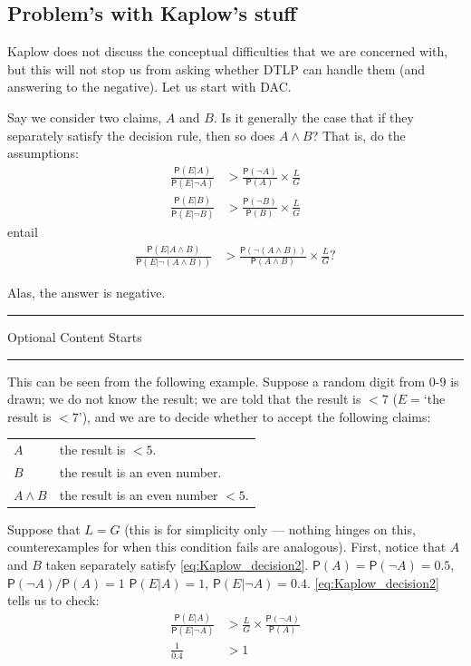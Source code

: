 \documentclass[10pt,dvipsnames,enabledeprecatedfontcommands]{scrartcl}
\newcommand{\n}{\neg}
\newcommand{\et}{\wedge}
\newcommand{\pr}[1]{\mathsf{P}(#1)}
\newcommand{\intermezzoa}{
	\begin{minipage}[c]{13cm}
	\begin{center}\rule{10cm}{0.4pt}



	\tiny{\sc Optional Content Starts}
	
	\vspace{-1mm}
	
	\rule{10cm}{0.4pt}\end{center}
	\end{minipage}\nopagebreak 
	}
\begin{document}
\hypertarget{problems-with-kaplows-stuff}{%
\subsection{Problem's with Kaplow's
stuff}\label{problems-with-kaplows-stuff}}

Kaplow does not discuss the conceptual difficulties that we are
concerned with, but this will not stop us from asking whether DTLP can
handle them (and answering to the negative). Let us start with DAC.

Say we consider two claims, \(A\) and \(B\). Is it generally the case
that if they separately satisfy the decision rule, then so does
\(A\et B\)? That is, do the assumptions: \begin{align*}
 \frac{\pr{E\vert A}}{\pr{E\vert \n A}}  & > \frac{\pr{\n A}}{\pr{A}} \times \frac{L}{G}\\
 \frac{\pr{E\vert B}}{\pr{E\vert \n B}}  & > \frac{\pr{\n B}}{\pr{B}} \times \frac{L}{G}
 \end{align*} \noindent entail \begin{align*}
 \frac{\pr{E\vert A\et B}}{\pr{E\vert \n (A\et B)}}  & > \frac{\pr{\n (A\et B)}}{
 \pr{A\et B}} \times \frac{L}{G}?
 \end{align*}

Alas, the answer is negative.

\intermezzoa

This can be seen from the following example. Suppose a random digit from
0-9 is drawn; we do not know the result; we are told that the result is
\(<7\) (\(E=\)`the result is \(<7\)'), and we are to decide whether to
accept the following claims:

\begin{center}
 \begin{tabular}{@{}ll@{}}
 \toprule
 $A$ & the result is $<5$. \\
 $B$  & the result is an even number.\\
 $A\et B$ & the result is an even number $<5$. \\
 \bottomrule
 \end{tabular}
 \end{center}

Suppose that \(L=G\) (this is for simplicity only --- nothing hinges on
this, counterexamples for when this condition fails are analogous).
First, notice that \(A\) and \(B\) taken separately satisfy
\eqref{eq:Kaplow_decision2}. \(\pr{A}=\pr{\n A}=0.5\),
\(\pr{\n A}/\pr{A}=1\) \(\pr{E\vert A}=1\), \(\pr{E\vert \n A}=0.4\).
\eqref{eq:Kaplow_decision2} tells us to check: \begin{align*}
 \frac{\pr{E\vert A}}{\pr{E\vert \n A}}&> \frac{L}{G}\times \frac{\pr{\n A}}{\pr{A}}\\
 \frac{1}{0.4} & > 1
 \end{align*}
\end{document}
